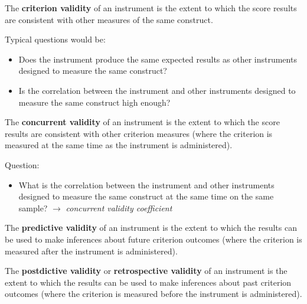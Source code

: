 \documentclass[
  11pt,
  a4paper,
  twoside,symmetric,openright]{book}
\providecommand{\tightlist}{%
  \setlength{\itemsep}{0pt}\setlength{\parskip}{0pt}}
\theoremstyle{break}
\theoremstyle{break}
\begin{document}
\begin{definition}
\protect\hypertarget{def:defcriterionvalidity}{}\label{def:defcriterionvalidity}The \textbf{criterion validity} of an instrument is the extent to which the score results are consistent with other measures of the same construct.
\end{definition}

Typical questions would be:

\begin{itemize}
\tightlist
\item
  Does the instrument produce the same expected results as other instruments designed to measure the same construct?
\item
  Is the correlation between the instrument and other instruments designed to measure the same construct high enough?
\end{itemize}

\begin{definition}
\protect\hypertarget{def:defconcurrentvalidity}{}\label{def:defconcurrentvalidity}The \textbf{concurrent validity} of an instrument is the extent to which the score results are consistent with other criterion measures (where the criterion is measured at the same time as the instrument is administered).
\end{definition}

Question:

\begin{itemize}
\tightlist
\item
  What is the correlation between the instrument and other instruments designed to measure the same construct at the same time on the same sample? \(\rightarrow\) \emph{concurrent validity coefficient}
\end{itemize}

\begin{definition}
\protect\hypertarget{def:defpredictivevalidity}{}\label{def:defpredictivevalidity}The \textbf{predictive validity} of an instrument is the extent to which the results can be used to make inferences about future criterion outcomes (where the criterion is measured after the instrument is administered).
\end{definition}

\begin{definition}
\protect\hypertarget{def:defpostdictivevalidity}{}\label{def:defpostdictivevalidity}The \textbf{postdictive validity} or \textbf{retrospective validity} of an instrument is the extent to which the results can be used to make inferences about past criterion outcomes (where the criterion is measured before the instrument is administered).
\end{definition}
\end{document}
